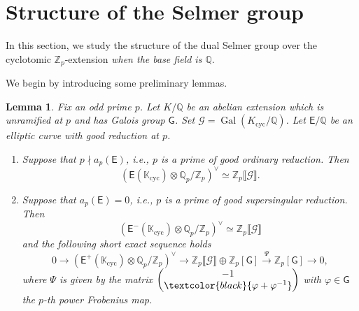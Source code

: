 \documentclass{amsart}
\newcommand{\edit}[1]{\textcolor{black}{#1}}
\newtheorem{lemma}[theorem]{Lemma}
\numberwithin{equation}{section}
\theoremstyle{remark}
\newcommand{\EC}{\mathsf{E}}
\newcommand{\cG}{\mathcal{G}}
\newcommand{\Gal}{\operatorname{Gal}}
\newcommand{\Qp}{\mathbb{Q}_p}
\newcommand{\sG}{\mathsf{G}}
\newcommand{\K}{\mathbb{K}}
\newcommand{\Zp}{\mathbb{Z}_p}
\newcommand{\Q}{\mathbb{Q}}
\newcommand{\cyc}{\operatorname{{cyc}}}
\theoremstyle{plain} %
\begin{document}
\section{Structure of the Selmer group}
\label{sec: Selmer group}

In this section, we study the structure of the dual Selmer group over the cyclotomic $\Zp$-extension \textit{when the base field is $\Q$}.

We begin by introducing some preliminary lemmas.

\begin{lemma}
\label{Lemma 1 Note 2}
Fix an odd prime $p$.
Let $K/\Q$ be an abelian extension which is unramified at $p$ and has Galois group $\sG$.
Set $\cG = \Gal(K_{\cyc}/\Q)$.
Let $\EC/\Q$ be an elliptic curve with good reduction at $p$.
\begin{enumerate}
\item[\textup{(}i\textup{)}]
Suppose that $p\nmid a_p(\EC)$, i.e., $p$ is a prime of good \emph{ordinary} reduction.
Then
\[
\left(\EC(\K_{\cyc}) \otimes \Qp/\Zp\right)^\vee \simeq \Zp\llbracket \cG\rrbracket.
\]
\item[\textup{(}ii\textup{)}]
Suppose that $a_p(\EC)=0$, i.e., $p$ is a prime of good \emph{supersingular} reduction.
Then 
\[
\left(\EC^{-}(\K_{\cyc})\otimes \Qp/\Zp\right)^\vee \simeq \Zp\llbracket \cG \rrbracket
\]
and the following short exact sequence holds
\[
0 \longrightarrow \left(\EC^{+}(\K_{\cyc})\otimes \Qp/\Zp\right)^\vee \longrightarrow \Zp\llbracket \cG \rrbracket \oplus \Zp[\sG] \xrightarrow{\Psi} \Zp[\sG] \longrightarrow 0,
\]
where $\Psi$ is given by the matrix $\begin{pmatrix}
-1 \\ \edit{\varphi + \varphi^{-1}}
\end{pmatrix}$ with $\varphi\in \sG$ the $p$-th power Frobenius map.
\end{enumerate}
\end{lemma}
\end{document}
